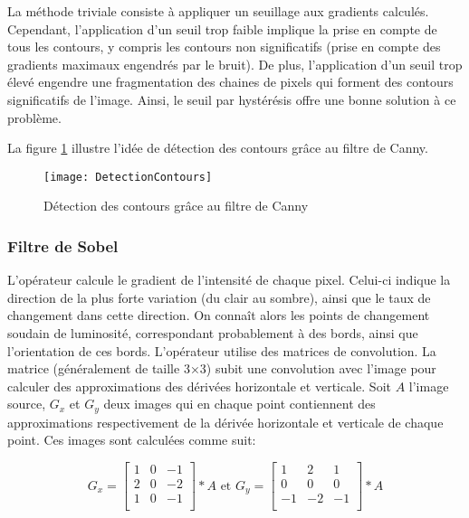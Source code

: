 La méthode triviale consiste à appliquer un seuillage aux gradients calculés. Cependant, l’application d’un seuil trop faible implique la prise en compte de tous les contours, y compris les contours non significatifs (prise en compte des gradients maximaux engendrés par le bruit). De plus, l’application d’un seuil trop élevé engendre une fragmentation des chaines de pixels qui forment des contours significatifs de l’image. Ainsi, le seuil par hystérésis offre une bonne solution à ce problème. 

La figure \ref{fig:DetectionContours} illustre l’idée de détection des contours grâce au filtre de Canny.
\begin{figure}[H]
  \centering
  \texttt{[image: DetectionContours]}
  \caption{Détection des contours grâce au filtre de Canny}
  \label{fig:DetectionContours}
\end{figure}

\subsubsection*{Filtre de Sobel}

L'opérateur calcule le gradient de l'intensité de chaque pixel. Celui-ci indique la direction de la plus forte variation (du clair au sombre), ainsi que le taux de changement dans cette direction. On connaît alors les points de changement soudain de luminosité, correspondant probablement à des bords, ainsi que l'orientation de ces bords.
L'opérateur utilise des matrices de convolution. La matrice (généralement de taille 3×3) subit une convolution avec l'image pour calculer des approximations des dérivées horizontale et verticale. Soit $A$ l'image source, $G_x$ et $G_y$ deux images qui en chaque point contiennent des approximations respectivement de la dérivée horizontale et verticale de chaque point. Ces images sont calculées comme suit:

$$G_x = 
\begin{bmatrix}
	1 & 0 & -1 \\
	2 & 0 & -2 \\
	1 & 0 & -1 \\
\end{bmatrix}
* A \text{ et } G_y =
\begin{bmatrix}
	1 & 2 & 1 \\
	0 & 0 & 0 \\
	-1 & -2 & -1 \\
\end{bmatrix}
* A
$$

